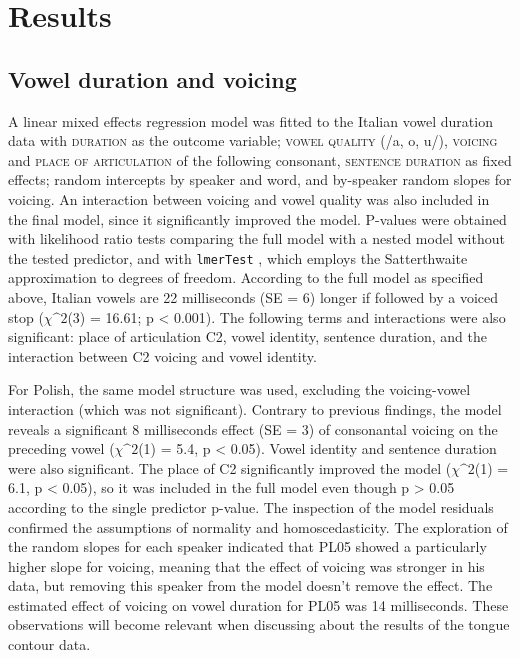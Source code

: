 \documentclass[authoryear, twocolumn]{elsarticle}
\begin{document}
\section{Results}\label{results}

\subsection{Vowel duration and
voicing}\label{vowel-duration-and-voicing}

A linear mixed effects regression model was fitted to the Italian vowel
duration data with \textsc{duration} as the outcome variable;
\textsc{vowel quality} (/a, o, u/), \textsc{voicing} and
\textsc{place of articulation} of the following consonant,
\textsc{sentence duration} as fixed effects; random intercepts by
speaker and word, and by-speaker random slopes for voicing. An
interaction between voicing and vowel quality was also included in the
final model, since it significantly improved the model. P-values were
obtained with likelihood ratio tests comparing the full model with a
nested model without the tested predictor, and with \texttt{lmerTest}
\citep{kuznetsova2016}, which employs the Satterthwaite approximation to
degrees of freedom. According to the full model as specified above,
Italian vowels are 22 milliseconds (SE = 6) longer if followed by a
voiced stop (\(\chi\^2\)(3) = 16.61; p \textless{} 0.001). The following
terms and interactions were also significant: place of articulation C2,
vowel identity, sentence duration, and the interaction between C2
voicing and vowel identity.

For Polish, the same model structure was used, excluding the
voicing-vowel interaction (which was not significant). Contrary to
previous findings, the model reveals a significant 8 milliseconds effect
(SE = 3) of consonantal voicing on the preceding vowel (\(\chi\^2\)(1) =
5.4, p \textless{} 0.05). Vowel identity and sentence duration were also
significant. The place of C2 significantly improved the model
(\(\chi\^2\)(1) = 6.1, p \textless{} 0.05), so it was included in the
full model even though p \textgreater{} 0.05 according to the single
predictor p-value. The inspection of the model residuals confirmed the
assumptions of normality and homoscedasticity. The exploration of the
random slopes for each speaker indicated that PL05 showed a particularly
higher slope for voicing, meaning that the effect of voicing was
stronger in his data, but removing this speaker from the model doesn't
remove the effect. The estimated effect of voicing on vowel duration for
PL05 was 14 milliseconds. These observations will become relevant when
discussing about the results of the tongue contour data.
\end{document}
